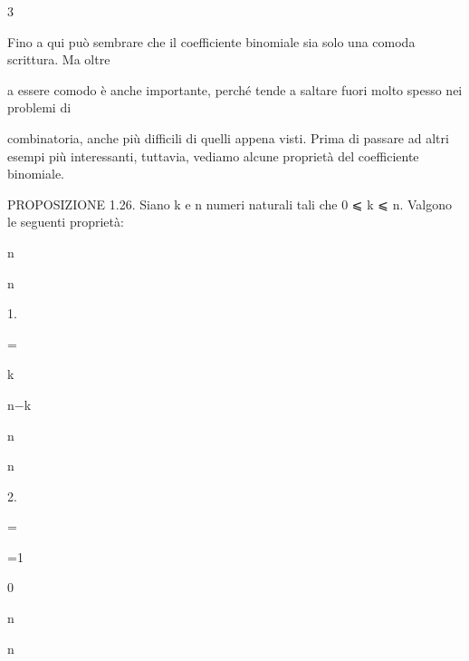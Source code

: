 \documentclass[a4paper,portrait,12pt]{article}
\begin{document}
3


\begin{flushleft}
Fino a qui pu\`{o} sembrare che il coefficiente binomiale sia solo una comoda scrittura. Ma oltre
\end{flushleft}


\begin{flushleft}
a essere comodo \`{e} anche importante, perch\'{e} tende a saltare fuori molto spesso nei problemi di
\end{flushleft}


\begin{flushleft}
combinatoria, anche più difficili di quelli appena visti. Prima di passare ad altri esempi più interessanti, tuttavia, vediamo alcune propriet\`{a} del coefficiente binomiale.
\end{flushleft}


\begin{flushleft}
PROPOSIZIONE 1.26. Siano k e n numeri naturali tali che 0 ⩽ k ⩽ n. Valgono le seguenti propriet\`{a}:
\end{flushleft}


\begin{flushleft}
n
\end{flushleft}


\begin{flushleft}
n
\end{flushleft}


1.


=


\begin{flushleft}
k
\end{flushleft}


\begin{flushleft}
n$-$k
\end{flushleft}


\begin{flushleft}
n
\end{flushleft}


\begin{flushleft}
n
\end{flushleft}


2.


=


=1


0


\begin{flushleft}
n
\end{flushleft}


\begin{flushleft}
n
\end{flushleft}
\end{document}
